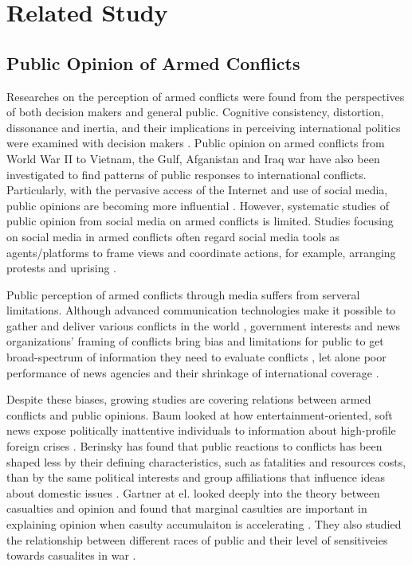 \section{Related Study}
\subsection{Public Opinion of Armed Conflicts}
Researches on the perception of armed conflicts were found from the perspectives of both decision makers and general public. Cognitive consistency, distortion, dissonance and inertia, and their implications in perceiving international politics were examined with decision makers \cite{Jervis1976}. Public opinion on armed conflicts from World War II to Vietnam, the Gulf, Afganistan and Iraq war have also been investigated to find patterns of public responses to international conflicts. Particularly, with the pervasive access of the Internet and use of social media, public opinions are becoming more influential \cite{Shirky2011}. However, systematic studies of public opinion from social media on armed conflicts is limited. Studies focusing on social media in armed conflicts often regard social media tools as agents/platforms to frame views and coordinate actions, for example, arranging protests and uprising \cite{Lim2012}.

Public perception of armed conflicts through media suffers from serveral limitations. Although advanced communication technologies make it possible to gather and deliver various conflicts in the world \cite{Sacco2015}, government interests and news organizations' framing of conflicts bring bias and limitations for public to get broad-spectrum of information they need to evaluate conflicts \cite{Nelson1997}, let alone poor performance of news agencies and their shrinkage of international coverage \cite{Seib2004}. 

Despite these biases, growing studies are covering relations between armed conflicts and public opinions. Baum looked at how entertainment-oriented, soft news expose politically inattentive individuals to information about high-profile foreign crises \cite{Baum2002}. Berinsky has found that public reactions to conflicts has been shaped less by their defining characteristics, such as fatalities and resources costs, than by the same political interests and group affiliations that influence ideas about domestic issues \cite{Berinsky2009}. Gartner at el. looked deeply into the theory between casualties and opinion and found that marginal casulties are important in explaining opinion when casulty accumulaiton is accelerating \cite{Gartner1998}. They also studied the relationship between different races of public and their level of sensitiveies towards casualites in war \cite{Gartner2000}. 

